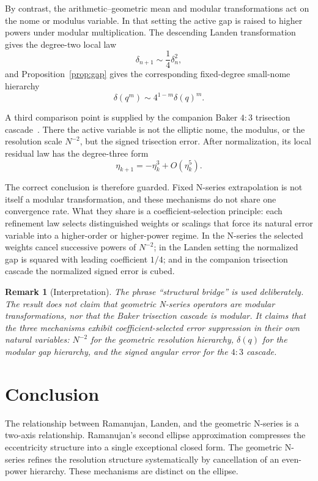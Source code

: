 \documentclass[11pt]{article}
\newtheorem{remark}{Remark}
\begin{document}
By contrast, the arithmetic--geometric mean and modular transformations act on
the nome or modulus variable. In that setting the active gap is raised to
higher powers under modular multiplication. The descending Landen
transformation gives the degree-two local law
\[
\delta_{n+1}\sim\frac14\delta_n^2,
\]
and Proposition~\ref{prop:gap} gives the corresponding fixed-degree small-nome
hierarchy
\[
\delta(q^m)\sim4^{1-m}\delta(q)^m.
\]

A third comparison point is supplied by the companion Baker $4{:}3$ trisection
cascade~\cite{BakerCascade2026}. There the active variable is not the elliptic
nome, the modulus, or the resolution scale $N^{-2}$, but the signed trisection
error. After normalization, its local residual law has the degree-three form
\[
\eta_{k+1}=-\eta_k^3+O(\eta_k^5).
\]

The correct conclusion is therefore guarded. Fixed N-series extrapolation is
not itself a modular transformation, and these mechanisms do not share one
convergence rate. What they share is a coefficient-selection principle: each
refinement law selects distinguished weights or scalings that force its natural
error variable into a higher-order or higher-power regime. In the N-series the
selected weights cancel successive powers of $N^{-2}$; in the Landen setting the
normalized gap is squared with leading coefficient $1/4$; and in the companion
trisection cascade the normalized signed error is cubed.

\begin{remark}[Interpretation]
The phrase ``structural bridge'' is used deliberately. The result does not claim
that geometric N-series operators are modular transformations, nor that the
Baker trisection cascade is modular. It claims that the three mechanisms exhibit
coefficient-selected error suppression in their own natural variables:
$N^{-2}$ for the geometric resolution hierarchy, $\delta(q)$ for the modular gap
hierarchy, and the signed angular error for the $4{:}3$ cascade.
\end{remark}

\section{Conclusion}

The relationship between Ramanujan, Landen, and the geometric N-series is a
two-axis relationship. Ramanujan's second ellipse approximation compresses the
eccentricity structure into a single exceptional closed form. The geometric
N-series refines the resolution structure systematically by cancellation of an
even-power hierarchy. These mechanisms are distinct on the ellipse.
\end{document}
